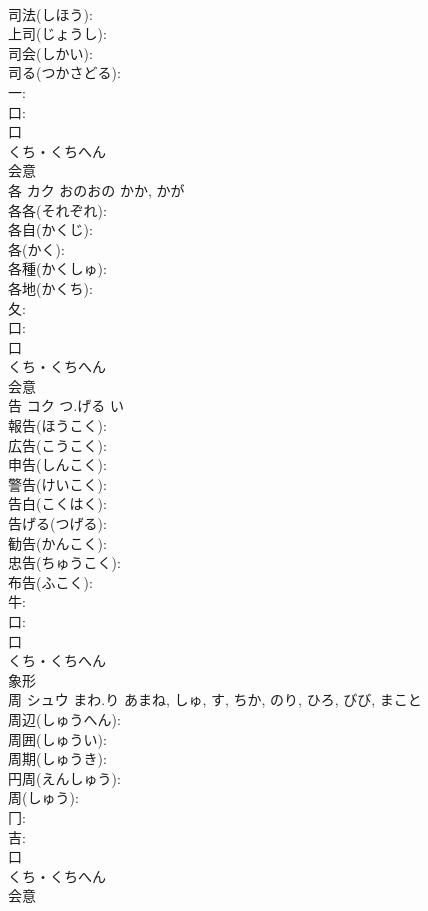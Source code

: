 \documentclass[8pt]{extreport}
\begin{document}
\begin{CJK}{UTF8}{min}
\\	司法(しほう): 
\\	上司(じょうし): 
\\	司会(しかい): 
\\	司る(つかさどる): 
\\	一: 
\\	口: 
\\	口	
\\	くち・くちへん	
\\	会意 
\\	各	カク	おのおの	かか, かが	
\\	各各(それぞれ): 
\\	各自(かくじ): 
\\	各(かく): 
\\	各種(かくしゅ): 
\\	各地(かくち): 
\\	夂: 
\\	口: 
\\	口	
\\	くち・くちへん	
\\	会意 
\\	告	コク	つ.げる	い	
\\	報告(ほうこく): 
\\	広告(こうこく): 
\\	申告(しんこく): 
\\	警告(けいこく): 
\\	告白(こくはく): 
\\	告げる(つげる): 
\\	勧告(かんこく): 
\\	忠告(ちゅうこく): 
\\	布告(ふこく): 
\\	牛: 
\\	口: 
\\	口	
\\	くち・くちへん	
\\	象形 
\\	周	シュウ	まわ.り	あまね, しゅ, す, ちか, のり, ひろ, びび, まこと	
\\	周辺(しゅうへん): 
\\	周囲(しゅうい): 
\\	周期(しゅうき): 
\\	円周(えんしゅう): 
\\	周(しゅう): 
\\	冂: 
\\	吉: 
\\	口	
\\	くち・くちへん	
\\	会意 

\end{CJK}
\end{document}
